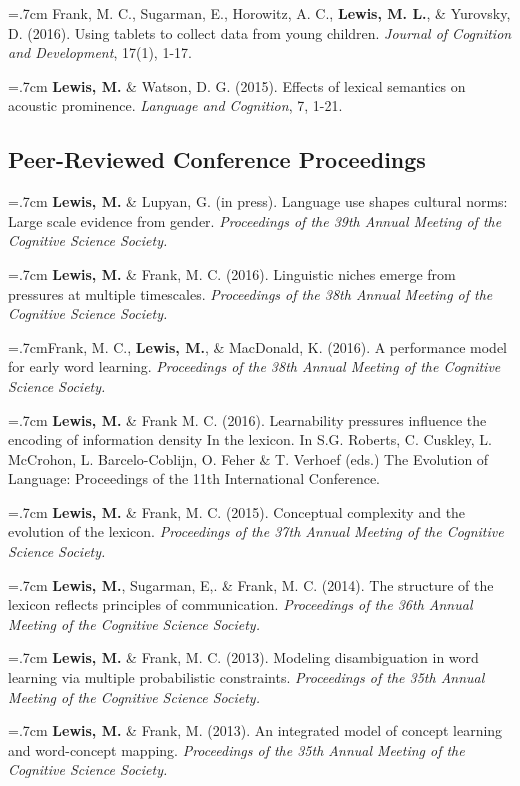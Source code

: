 \documentclass[letterpaper]{article}
\begin{document}
 \hangindent=.7cm Frank, M. C., Sugarman, E., Horowitz, A. C., {\bf Lewis, M. L.}, \& Yurovsky, D. (2016). Using tablets to collect data from young children. {\it Journal of Cognition and Development}, 17(1), 1-17. 
 
  \hangindent=.7cm {\bf Lewis, M.} \& Watson, D. G. (2015). Effects of lexical semantics on acoustic prominence. { \it Language and Cognition}, 7, 1-21. 

  \subsection*{Peer-Reviewed Conference Proceedings} 
    \hangindent=.7cm {\bf Lewis, M.} \& Lupyan, G. (in press). Language use shapes cultural norms: Large scale evidence from gender.  { \it Proceedings of the 39th Annual Meeting of the Cognitive Science Society.}

  \hangindent=.7cm {\bf Lewis, M.} \& Frank, M. C. (2016). Linguistic niches emerge from pressures at multiple timescales. { \it Proceedings of the 38th Annual Meeting of the Cognitive Science Society.}

   \hangindent=.7cmFrank, M. C.,  {\bf Lewis, M.}, \& MacDonald, K. (2016). A performance model for early word learning.  { \it Proceedings of the 38th Annual Meeting of the Cognitive Science Society.}

  \hangindent=.7cm {\bf Lewis, M.} \& Frank M. C. (2016). Learnability pressures influence the encoding of information density In the lexicon. In S.G. Roberts, C. Cuskley, L. McCrohon, L. Barcelo-Coblijn, O. Feher \& T. Verhoef (eds.) The Evolution of Language: Proceedings of the 11th International Conference.


 \hangindent=.7cm {\bf Lewis, M.} \& Frank, M. C. (2015). Conceptual complexity and the evolution of the lexicon. { \it Proceedings of the 37th Annual Meeting of the Cognitive Science Society.}
 
 \hangindent=.7cm {\bf Lewis, M.}, Sugarman, E,. \& Frank, M. C. (2014). The structure of the lexicon reflects principles of communication. { \it Proceedings of the 36th Annual Meeting of the Cognitive Science Society.}
  
 \hangindent=.7cm {\bf Lewis, M.} \& Frank, M. C. (2013). Modeling disambiguation in word learning via multiple probabilistic constraints. { \it Proceedings of the 35th Annual Meeting of the Cognitive Science Society.}

 \hangindent=.7cm {\bf Lewis, M.} \& Frank, M. (2013). An integrated model of concept learning and word-concept mapping.{ \it Proceedings of the 35th Annual Meeting of the Cognitive Science Society.}
 
\end{document}
